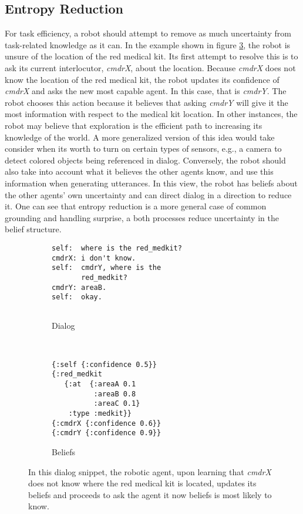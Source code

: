 \documentclass[12pt]{article}
\begin{document}
\subsection{Entropy Reduction}

For task efficiency, a robot should attempt to remove as much
uncertainty from task-related knowledge as it can. In the example
shown in figure \ref{fig:er}, the robot is unsure of the location of
the red medical kit. Its first attempt to resolve this is to ask its
current interlocutor, \textit{cmdrX}, about the location. Because
\textit{cmdrX} does not know the location of the red medical kit, the
robot updates its confidence of \textit{cmdrX} and asks the new most
capable agent. In this case, that is \textit{cmdrY}. The robot chooses
this action because it believes that asking \textit{cmdrY} will give
it the most information with respect to the medical kit location. In
other instances, the robot may believe that exploration is the
efficient path to increasing its knowledge of the world. A more
generalized version of this idea would take consider when its worth to
turn on certain types of sensors, e.g., a camera to detect colored
objects being referenced in dialog. Conversely, the robot should also
take into account what it believes the other agents know, and use this
information when generating utterances. In this view, the robot has
beliefs about the other agents' own uncertainty and can direct dialog
in a direction to reduce it. One can see that entropy reduction is a
more general case of common grounding and handling surprise, a both
processes reduce uncertainty in the belief structure.

\begin{figure}[h]
  \centering
  \begin{subfigure}[t]{0.4\textwidth}
    \centering
\begin{verbatim}
self:  where is the red_medkit?
cmdrX: i don't know.
self:  cmdrY, where is the
       red_medkit?
cmdrY: areaB.
self:  okay.


\end{verbatim}
    \label{fig:er_text}
    \caption{Dialog}
  \end{subfigure}
  ~\qquad\qquad
  \begin{subfigure}[t]{0.4\textwidth}
    \centering
\begin{verbatim}
{:self {:confidence 0.5}}
{:red_medkit
   {:at  {:areaA 0.1
          :areaB 0.8
          :areaC 0.1}
    :type :medkit}}
{:cmdrX {:confidence 0.6}}
{:cmdrY {:confidence 0.9}}
\end{verbatim}
    \label{fig:er_beliefs}
    \caption{Beliefs}
  \end{subfigure}
  \caption{In this dialog snippet, the robotic agent, upon learning
    that \textit{cmdrX} does not know where the red medical kit is
    located, updates its beliefs and proceeds to ask the agent it now
    beliefs is most likely to know.}
  \label{fig:er}
\end{figure}
\end{document}
